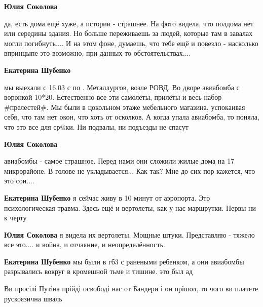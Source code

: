 \begin{itemize} %
\textbf{Юлия Соколова} 

да, есть дома ещё хуже, а истории - страшнее. На фото видела, что полдома нет
или середины здания. Но больше переживаешь за людей, которые там в завалах
могли погибнуть.... И на этом фоне, думаешь, что тебе ещё и повезло - насколько
впринцыпе это возможно, при данных-то обстоятельствах....

\textbf{Екатерина Шубенко} 

мы выехали с 16.03 с по . Металлургов, возле РОВД. Во дворе авиабомба с
воронкой 10*20. Естественно все эти самолёты, прилёты и весь набор \#прелестей\#.
Мы были в цокольном этаже мебельного магазина, успокаивая себя, что там нет
окон, что хоть от осколков. А когда упала авиабомба, то поняла, что это все для
ср@ки. Ни подвалы, ни подъезды не спасут

\textbf{Юлия Соколова} 

авиабомбы - самое страшное. Перед нами они сложили жилые дома на 17
микрорайоне. В голове не укладывается... Как так? Мне до сих пор кажется, что
это сон....

\textbf{Екатерина Шубенко} я сейчас живу в 10 минут от аэропорта. Это психологическая травма. Здесь ещё и вертолеты, как у нас маршрутки. Нервы ни к черту

\textbf{Юлия Соколова} я видела их вертолеты. Мощные штуки. Представляю - тяжело все это.... и война, и отчаяние, и неопределённость.

\textbf{Екатерина Шубенко} мы были в гб3 с ранеными ребенком, а они авиабомбы разрывались вокруг в кромешной тьме и тишине. это был ад

\end{itemize} %


Ви просілі Путіна прійді освободі нас от Бандери і он прішол, то чого ви плачете рускоязична шваль

